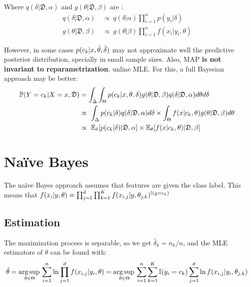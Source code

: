 Where $q(\delta|\mathfrak{D},\alpha)$ and $g(\theta|\mathfrak{D},\beta)$ are :
\begin{align*}
    q(\delta|\mathfrak{D},\alpha)\ & \propto\ q(\delta|\alpha)\prod_{i=1}^n p(y_i|\delta)\\ 
    g(\theta|\mathfrak{D},\beta)\ & \propto\  g(\theta|\beta)\prod_{i=1}^n f(x_i|y_i,\theta)
\end{align*}

However, in some cases $p(c_k|x,\Tilde{\theta},\Tilde{\delta}) $ may not approximate well the predictive posterior distribution, specially in small sample sizes. Also, MAP \textbf{is not invariant to reparametrization}, unline MLE. For this, a full Bayesian approach may be better:
\begin{align*}
    \operatorname{\mathbb{P}}(Y=c_k|X=x,\mathfrak{D}) &=\int_{\Delta}\int_{\Theta}p(c_k|x,\theta,\delta)g(\theta|\mathfrak{D},\beta)q(\delta|\mathfrak{D},\alpha)d\theta d\delta \\
    &\propto\ \int_{\Delta} p(c_k|\delta)q(\delta|\mathfrak{D},\alpha) d\delta\times \int_{\Theta}f(x|c_k,\theta) g(\theta|\mathfrak{D},\beta) d\theta\\
    &\propto\ \operatorname{\mathbb{E}}_{\delta}[p(c_k|\delta)|\mathfrak{D},\alpha]\times \operatorname{\mathbb{E}}_{\theta}[f(x|c_k,\theta)|\mathfrak{D},\beta]
\end{align*}





\section{Naïve Bayes}
The naïve Bayes approach assumes that features are  given the class label. This means that $f(x_i|y,\theta)=\prod_{j=1}^d\prod_{k=1}^K  f(x_{i,j}|y,\theta_{j,k})^{\operatorname{\mathbb{I}}(y=c_k)}$

\subsection{Estimation}

The maximization process is separable, so we get $\hat{\delta}_{k}=n_k/n$, and the MLE estimators of $\theta$ can be found with:
\begin{equation*}
    \hat{\theta}  = \operatorname*{arg\,sup\,}_{\theta\in\Theta} \sum_{i=1}^n\ln\prod_{j=1}^d f(x_{i,j}|y_i,\theta) = \operatorname*{arg\,sup\,}_{\theta\in\Theta} \sum_{i=1}^n\sum_{k=1}^K\operatorname{\mathbb{I}}(y_i=c_k)\sum_{j=1}^d\ln f(x_{i,j}|y_i,\theta_{j,k})
\end{equation*}

